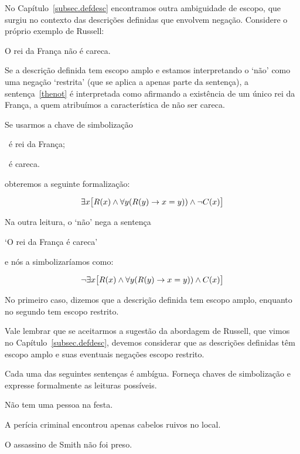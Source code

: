 No Capítulo~\ref{subsec.defdesc} encontramos outra ambiguidade de escopo, que surgiu no contexto das descrições definidas que envolvem negação. Considere o próprio exemplo de Russell:

\begin{earg}
    \item [\ex{thenot}] O rei da França não é careca.
\end{earg}

Se a descrição definida tem escopo amplo e estamos interpretando o `não' como uma negação `restrita' (que se aplica a apenas parte da sentença), a sentença~\ref{thenot} é interpretada como afirmando a existência de um único rei da França, a quem atribuímos a característica de não ser careca.

Se usarmos a chave de simbolização

\begin{ekey}
    \item [\atom{R}{x}] ~é rei da França;
    \item [\atom{C}{x}] ~é careca.
\end{ekey}

obteremos a seguinte formalização:

$$\exists x\bigl[\mathord{R}(x) \wedge \forall y (\mathord{R}(y) \rightarrow x = y)) \wedge \neg \mathord{C}(x)\bigr]$$

Na outra leitura, o `não' nega a sentença

\begin{center}
`O rei da França é careca'
\end{center}

e nós a simbolizaríamos como:

$$\neg \exists x\bigl[\mathord{R}(x) \wedge \forall y (\mathord{R}(y) \rightarrow x = y)) \wedge \mathord{C}(x)\bigr]$$

No primeiro caso, dizemos que a descrição definida tem escopo amplo, enquanto no segundo tem escopo restrito.

Vale lembrar que se aceitarmos a sugestão da abordagem de Russell, que vimos no Capítulo~\ref{subsec.defdesc}, devemos considerar que as descrições definidas têm escopo amplo e suas eventuais negações escopo restrito.

\practiceproblems
\problempart

Cada uma das seguintes sentenças é ambígua. Forneça chaves de simbolização e expresse formalmente as leituras possíveis.

\begin{earg}
    \item Não tem uma pessoa na festa.
    \item A perícia criminal encontrou apenas cabelos ruivos no local.
    \item O assassino de Smith não foi preso.
\end{earg}

